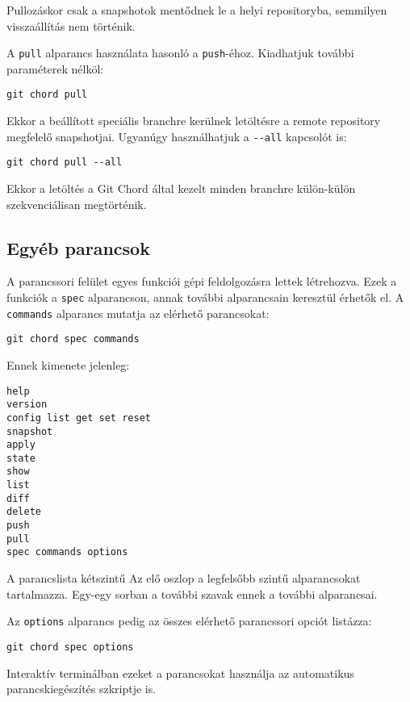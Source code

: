 \documentclass[final]{elteikthesis}[2025/03/25]
\begin{document}
Pullozáskor csak a snapshotok mentődnek le a helyi repositoryba,
semmilyen visszaállítás nem történik.

A \verb|pull| alparancs használata hasonló a \verb|push|-éhoz.
Kiadhatjuk további paraméterek nélköl:

\begin{verbatim}
git chord pull
\end{verbatim}

Ekkor a beállított speciális branchre kerülnek letöltésre a remote repository megfelelő snapshotjai.
Ugyanúgy használhatjuk a \verb|--all| kapcsolót is:

\begin{verbatim}
git chord pull --all
\end{verbatim}

Ekkor a letöltés a Git Chord által kezelt minden branchre külön-külön szekvenciálisan megtörténik.

\subsection{Egyéb parancsok}

A parancssori felület egyes funkciói gépi feldolgozásra lettek létrehozva.
Ezek a funkciók a \verb|spec| alparancson, annak további alparancsain keresztül érhetők el.
A \verb|commands| alparancs mutatja az elérhető parancsokat:

\begin{verbatim}
git chord spec commands
\end{verbatim}

Ennek kimenete jelenleg:

\begin{verbatim}
help
version
config list get set reset
snapshot
apply
state
show
list
diff
delete
push
pull
spec commands options
\end{verbatim}

A parancslista kétszintű
Az elő oszlop a legfelsőbb szintű alparancsokat tartalmazza.
Egy-egy sorban a további szavak ennek a további alparancsai.

Az \verb|options| alparancs pedig az összes elérhető parancssori opciót listázza:

\begin{verbatim}
git chord spec options
\end{verbatim}

Interaktív terminálban ezeket a parancsokat használja az automatikus parancskiegészítés szkriptje is.
\end{document}
